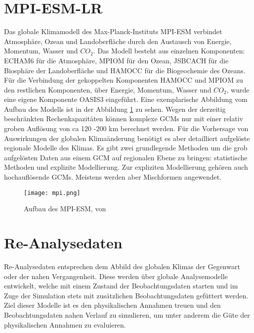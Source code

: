 \section{MPI-ESM-LR} \label{sec:MPI}
Das globale Klimamodell des Max-Planck-Instituts MPI-ESM verbindet Atmosphäre, Ozean und Landoberfläche durch den Austausch von Energie, Momentum, Wasser und $CO_{2}$. Das Modell besteht aus einzelnen Komponenten: ECHAM6 für die Atmosphäre, MPIOM für den Ozean, JSBCACH für die Biosphäre der Landoberfläche und HAMOCC für die Biogeochemie des Ozeans. Für die Verbindung der gekoppelten Komponenten HAMOCC und MPIOM zu den restlichen Komponenten, über Energie, Momentum, Wasser und $CO_2$, wurde eine eigene Komponente OASIS3 eingeführt. Eine exemplarische Abbildung vom Aufbau des Modells ist in der Abbildung \ref{fig:mpi-esm} zu sehen. Wegen der derzeitig beschränkten Rechenkapazitäten können komplexe GCMs nur mit einer relativ groben Auflösung von ca 120 -200 km berechnet werden. Für die Vorhersage von Auswirkungen der globalen Klimaänderung benötigt es aber detailliert aufgelöste regionale Modelle des Klimas. Es gibt zwei grundlegende Methoden um die grob aufgelösten Daten aus einem GCM auf regionalen Ebene zu bringen: statistische Methoden und explizite Modellierung. Zur expliziten Modellierung gehören auch hochauflösende GCMs. Meistens werden aber Mischformen angewendet.
\begin{figure}[h]
	\centering
	\texttt{[image: mpi.png]}
	\caption{Aufbau des MPI-ESM, von \cite{mpi-esm-lr}}
	\label{fig:mpi-esm}
\end{figure}
\section{Re-Analysedaten}
Re-Analysedaten entsprechen dem Abbild des globalen Klimas der Gegenwart oder der nahen Vergangenheit. Diese werden über globale Analysemodelle entwickelt, welche mit einem Zustand der Beobachtungsdaten starten und im Zuge der Simulation stets mit zusätzlichen Beobachtungsdaten gefüttert werden. Ziel dieser Modelle ist es den physikalischen Annahmen treuen und den Beobachtungsdaten nahen Verlauf zu simulieren, um unter anderem die Güte der physikalischen Annahmen zu evaluieren.
